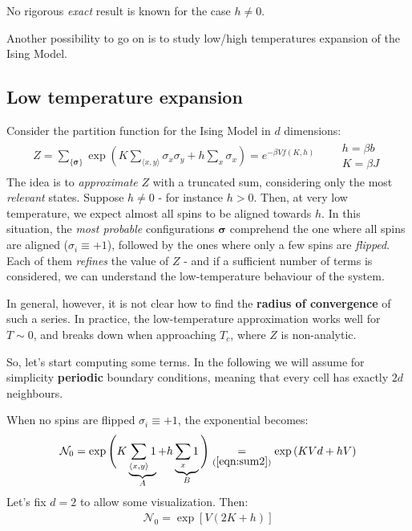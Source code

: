\documentclass[../../main.tex]{subfiles}
\begin{document}
\medskip

No rigorous \textit{exact} result is known for the case $h \neq 0$. 

\medskip

Another possibility to go on is to study low/high temperatures expansion of the Ising Model. 


\subsection{Low temperature expansion}
Consider the partition function for the Ising Model in $d$ dimensions:
\begin{align}\label{eqn:Z-again}
    Z= \sum_{\{\bm{\sigma}\}} \exp\left(K \sum_{\langle x,y \rangle} \sigma_x \sigma_y + h \sum_x \sigma_x\right) = e^{-\beta V f(K,h)} \qquad \substack{h = \beta b\\K = \beta J}
\end{align}
The idea is to \textit{approximate} $Z$ with a truncated sum, considering only the most \textit{relevant} states. Suppose $h\neq 0$ - for instance $h > 0$. Then, at very low temperature, we expect almost all spins to be aligned towards $h$. In this situation, the \textit{most probable} configurations $\bm{\sigma}$ comprehend the one where all spins are aligned ($\sigma_i \equiv +1$), followed by the ones where only a few spins are \textit{flipped}. Each of them \textit{refines} the value of $Z$ - and if a sufficient number of terms is considered, we can understand the low-temperature behaviour of the system.

\medskip

In general, however, it is not clear how to find the \textbf{radius of convergence} of such a series. In practice, the low-temperature approximation works well for $T \sim 0$, and breaks down when approaching $T_c$, where $Z$ is non-analytic.  

\medskip

So, let's start computing some terms. In the following we will assume for simplicity \textbf{periodic} boundary conditions, meaning that every cell has exactly $2d$ neighbours.


When no spins are flipped $\sigma_i \equiv +1$, the exponential becomes:
\begin{align}\label{eqn:term0a}
    \mathcal{N}_0 =\exp\Bigg(K \underbrace{\sum_{\langle x,y \rangle} 1 }_{A}+ h \underbrace{\sum_x 1}_{B}\Bigg) \underset{(\ref{eqn:sum2})}{=}  \exp\left(K V d + h V\right)
\end{align}  
Let's fix $d=2$ to allow some visualization. Then:
\begin{align}\label{eqn:term0}
    \mathcal{N}_0 = \exp[V(2K + h)]
\end{align}
\end{document}
